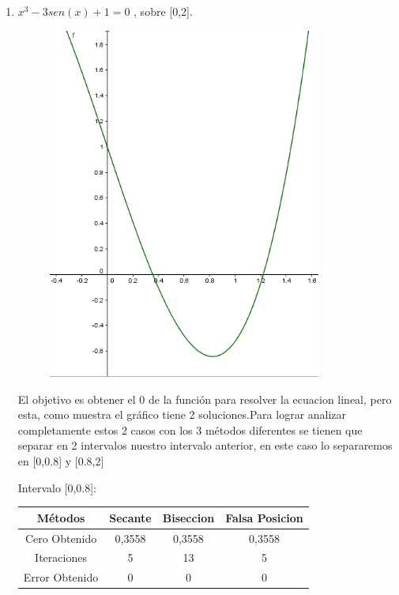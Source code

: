 \documentclass{udpreport}
\begin{document}
\begin{enumerate}
\begin{enumerate}
    \item  \(x^3 - 3sen(x) +1 = 0\) , sobre [0,2].
        \begin{figure}[H]
            \centering
            \includegraphics[width=9cm]{GraficoEj1a}
        \end{figure}
        El objetivo es obtener el 0 de la función para resolver la ecuacion lineal, pero esta, como muestra el gráfico tiene 2 soluciones.Para lograr analizar completamente estos 2 casos con los 3 métodos diferentes se tienen que separar en 2 intervalos nuestro intervalo anterior, en este caso lo separaremos en [0,0.8] y [0.8,2]\\
            \begin{table}[H]Intervalo [0,0.8]:
            \centering
                \begin{tabular} { |c|c|c|c|}
                \hline
                Métodos       & Secante & Biseccion & Falsa Posicion  \\
                \hline
                Cero Obtenido &  0,3558       &    0,3558       &      0,3558    \\
                \hline
                Iteraciones   &     5        &      13     &        5          \\
                \hline
                Error Obtenido &       0      &       0      &     0         \\
                 \hline
                \end{tabular}
            \end{table}
        

\end{enumerate}
\end{enumerate}
\end{document}
